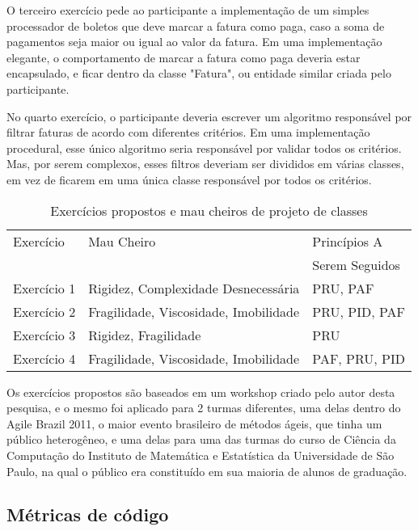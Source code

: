 \documentclass[conference]{IEEEtran}
\begin{document}
O terceiro exercício pede ao participante a implementação de um simples processador de boletos que
deve marcar a fatura como paga, caso a soma de pagamentos seja maior ou igual ao valor da fatura. 
Em uma implementação elegante, o comportamento de marcar a fatura como paga deveria estar encapsulado, e 
ficar dentro da classe "Fatura", ou entidade similar criada pelo participante.

No quarto exercício, o participante deveria escrever um algoritmo responsável por filtrar faturas de
acordo com diferentes critérios. Em uma implementação procedural, esse único algoritmo seria
responsável por validar todos os critérios. Mas, por serem complexos, esses filtros deveriam ser divididos em 
várias classes, em vez de ficarem em uma única classe responsável por todos os critérios.


\begin{table}
	\centering
	\begin{tabular}{| l | l | l | }
		\hline
		Exercício & Mau Cheiro & Princípios A\\
		& & Serem Seguidos\\
		
		\hline
		
		Exercício 1 & Rigidez, Complexidade Desnecessária & PRU, PAF \\
		Exercício 2 & Fragilidade, Viscosidade, Imobilidade & PRU, PID, PAF \\
		Exercício 3 & Rigidez, Fragilidade & PRU\\
		Exercício 4 & Fragilidade, Viscosidade, Imobilidade & PAF, PRU, PID \\
		
		\hline
	\end{tabular}
	\caption{Exercícios propostos e mau cheiros de projeto de classes}
	\label{tab:problemas-exercicios}
\end{table}

Os exercícios propostos são baseados em um workshop criado pelo autor desta pesquisa, e o mesmo
foi aplicado para 2 turmas diferentes, uma delas dentro do Agile Brazil 2011, o
maior evento brasileiro de métodos ágeis, que tinha um público heterogêneo, e uma delas para
uma das turmas do curso de Ciência da Computação do Instituto de Matemática e Estatística da Universidade
de São Paulo, na qual o público era constituído em sua maioria de alunos de graduação. 


\subsection{Métricas de código}
\end{document}
